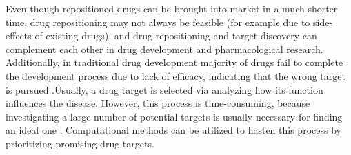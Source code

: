     Even though repositioned drugs can be brought into market in a much shorter time, drug repositioning may not always be feasible (for example due to side-effects of existing drugs), and drug repositioning and target discovery can complement each other in drug development and pharmacological research. Additionally, in traditional drug development majority of drugs fail to complete the development process due to lack of efficacy, indicating that the wrong target is pursued \cite{shih2018drug}.Usually, a drug target is selected via analyzing how its function influences the disease. However, this process is time-consuming, because investigating a large number of potential targets is usually necessary for finding an ideal one \cite{phoebe2008identifying}. Computational methods can be utilized to hasten this process by prioritizing promising drug targets. 

